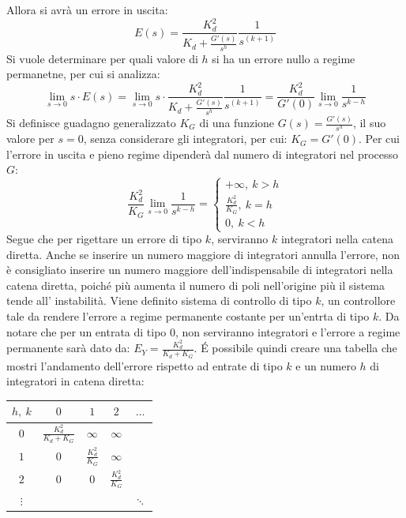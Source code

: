 \documentclass{article}
\numberwithin{equation}{subsection}
\begin{document}
Allora si avrà un errore in uscita:
\begin{equation}
    E(s)=\displaystyle\frac{K_d^2}{K_d+\displaystyle\frac{G'(s)}{s^h}}\frac{1}{s^{(k+1)}}
\end{equation}
Si vuole determinare per quali valore di $h$ si ha un errore nullo a regime permanetne, per cui si analizza: 
\begin{equation}
    \lim_{s\to0}s\cdot E(s)=\lim_{s\to0}s\cdot\displaystyle\frac{K_d^2}{K_d+\displaystyle\frac{G'(s)}{s^h}}\frac{1}{s^{(k+1)}}=\frac{K_d^2}{G'(0)}\lim_{s\to0}\frac{1}{s^{k-h}}
\end{equation}
Si definisce guadagno generalizzato $K_G$ di una funzione $G(s)=\displaystyle\frac{G'(s)}{s^h}$, il suo valore per $s=0$, senza considerare gli integratori, per cui: $K_G=G'(0)$. 
Per cui l'errore in uscita e pieno regime dipenderà dal numero di integratori nel processo $G$:
\begin{equation}
    \displaystyle\frac{K_d^2}{K_G}\lim_{s\to0}\frac{1}{s^{k-h}}=
    \begin{cases}
        +\infty,\:k>h\\
        \displaystyle\frac{K_d^2}{K_G},\:k=h\\
        0,\:k<h
    \end{cases}
\end{equation}
Segue che per rigettare un errore di tipo $k$, serviranno $k$ integratori nella catena diretta. Anche se inserire un numero maggiore di integratori annulla l'errore, non è 
consigliato inserire un numero maggiore dell'indispensabile di integratori nella catena diretta, poiché più aumenta il numero di poli nell'origine più il sistema tende all'
instabilità. Viene definito sistema di controllo di tipo $k$, un controllore tale da rendere l'errore a regime permanente costante per un'entrta di tipo $k$. Da notare che 
per un entrata di tipo $0$, non serviranno integratori e l'errore a regime permanente sarà dato da: $E_Y=\displaystyle\frac{K_d^2}{K_d+K_G}$. \'{E} possibile quindi 
creare una tabella che mostri l'andamento dell'errore rispetto ad entrate di tipo $k$ e un numero $h$ di integratori in catena diretta:

\begin{center}
    \begin{tabular}{|c|c|c|c|c}
        \hline
        $h,\:k$ & $0$ & $1$ & $2$ & $\ldots$\\[0.5ex]
        \hline
        $0$ & $\displaystyle\frac{K_d^2}{K_d+K_G}$ & $\infty$ &$\infty$\\[0.5ex]
        \hline
        $1$ & $0$ & $\displaystyle\frac{K_d^2}{K_G}$ & $\infty$\\[0.5ex]
        \hline
        $2$ & $0$ & $0$ & $\displaystyle\frac{K_d^2}{K_G}$\\[0.5ex]
        \hline
        $\vdots$ & & & & $\ddots$\\
    \end{tabular}
\end{center}
\end{document}
